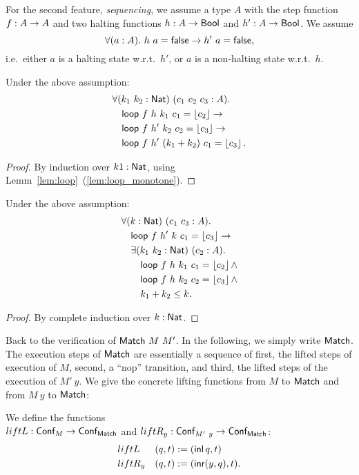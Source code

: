 For the second feature, \emph{sequencing}, we assume a type $A$ with the step function $f : A \rightarrow A$ and two halting functions
$h : A \rightarrow \textsf{Bool}$ and $h' : A \rightarrow \textsf{Bool}$.  We assume
\[
  \forall(a:A).~h~a = \textsf{false} \rightarrow h'~a = \textsf{false},
\]
i.e.\ either $a$ is a halting state w.r.t.\ $h'$, or $a$ is a non-halting state w.r.t.\ $h$.
\begin{lemma}
  \label{lem:loop_merge}
  Under the above assumption:
  \begin{align*}
    & \forall (k_1~k_2:\textsf{Nat})~(c_1~c_2~c_3 : A).\\
    & \quad \textsf{loop}~f~h ~k_1      ~c_1 = \left\lfloor {c_2} \right\rfloor \rightarrow\\
    & \quad \textsf{loop}~f~h'~k_2      ~c_2 = \left\lfloor {c_3} \right\rfloor \rightarrow\\
    & \quad \textsf{loop}~f~h'~(k_1+k_2)~c_1 = \left\lfloor {c_3} \right\rfloor.
  \end{align*}
\end{lemma}
\begin{proof}
  By induction over $k1:\textsf{Nat}$, using Lemm~\ref{lem:loop}~(\ref{lem:loop_monotone}).
\end{proof}
\begin{lemma}
  \label{lem:loop_split}
  Under the above assumption:
  \begin{align*}
    & \forall (k:\textsf{Nat})~(c_1~c_3 : A).\\
    & \quad \textsf{loop}~f~h'~k~c_1 = \left\lfloor {c_3} \right\rfloor \rightarrow \\
    & \quad \exists (k_1~k_2:\textsf{Nat})~(c_2:A).\\
    & \quad \quad \textsf{loop}~f~h~k_1~c_1 = \left\lfloor {c_2} \right\rfloor \land\\
    & \quad \quad \textsf{loop}~f~h~k_2~c_2 = \left\lfloor {c_3} \right\rfloor \land\\
    & \quad \quad k_1 + k_2 \leq k.
  \end{align*}
\end{lemma}
\begin{proof}
  By complete induction over $k:\textsf{Nat}$.
\end{proof}


Back to the verification of $\textsf{Match}~M~M'$.  In the following, we simply write $\textsf{Match}$.  The execution steps of $\textsf{Match}$ are essentially a sequence of
first, the lifted steps of execution of $M$, second, a ``nop'' transition, and third, the lifted steps of the execution of $M'~y$.  We give the
concrete lifting functions from $M$ to $\textsf{Match}$ and from $M~y$ to $\textsf{Match}$:
\begin{definition}
  We define the functions \\$liftL : \textsf{Conf}_M \rightarrow \textsf{Conf}_{\textsf{Match}}$ and $liftR_y : \textsf{Conf}_{M'~y} \rightarrow \textsf{Conf}_{\textsf{Match}}$:
  \begin{alignat*}{2}
    & liftL   & (q, t) &:= (\operatorname{\textsf{inl}} q,      t) \\
    & liftR_y & (q, t) &:= (\operatorname{\textsf{inr}} (y, q), t).
  \end{alignat*}
\end{definition}

